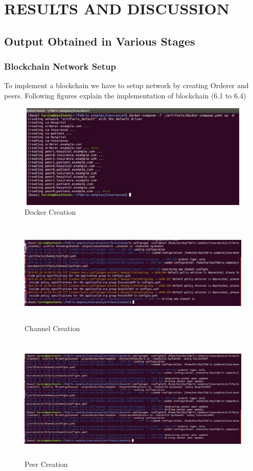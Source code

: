 
\chapter{RESULTS AND DISCUSSION} %

\section{Output Obtained in Various Stages}
\subsection{Blockchain Network Setup}
To implement a blockchain we have to setup network by creating
Orderer and peers. Following figures explain the implementation
of blockchain (6.1 to 6.4)
\begin{figure}[htb!]
  \centering
 \includegraphics[width = 15cm, height = 5cm] {Figures/docker.jpg}
  \caption{Docker Creation}
  \label{StH}	
\end{figure}

\begin{figure}[htb!]
  \centering
 \includegraphics[width = 15cm, height = 5cm] {Figures/channel.jpg}
  \caption{Channel Creation}
  \label{StH}	
\end{figure}

\begin{figure}[htb!]
  \centering
 \includegraphics[width = 15cm, height = 6cm] {Figures/peer.jpg}
  \caption{Peer Creation}
  \label{StH}	
\end{figure}

